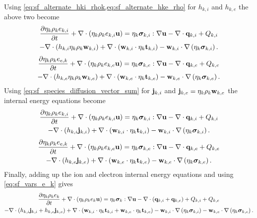 \documentclass[a4paper,11pt]{report}
\begin{document}
Using \cref{eq:sf_alternate_hki_rhok,eq:sf_alternate_hke_rho} for $h_{k,i}$ and $h_{k,e}$ the above two become
\begin{multline*}
    \frac{\partial \eta_k \rho_k e_{k,i}}{\partial t} + \nabla \cdot \left( \eta_k \rho_k e_{k,i} \mathbf{u} \right) = \eta_k \bm \sigma_{k,i} : \nabla \mathbf{u} - \nabla \cdot \mathbf{q}_{k,i} + Q_{k,i} \\
    - \nabla \cdot \left( h_{k,i} \eta_k \rho_k \mathbf{w}_{k,i} \right) + \nabla \cdot \left( \mathbf{w}_{k,i} \cdot \eta_k \mathbf{t}_{k,i} \right) - \mathbf{w}_{k,i} \cdot \nabla \left( \eta_k \bm \sigma_{k,i} \right).
\end{multline*}
\begin{multline*}
    \frac{\partial \eta_k \rho_k e_{e,k}}{\partial t} + \nabla \cdot \left( \eta_k \rho_k e_{k,e} \mathbf{u} \right) = \eta_k \bm \sigma_{k,e} : \nabla \mathbf{u} - \nabla \cdot \mathbf{q}_{k,e} + Q_{k,e} \\
    - \nabla \cdot \left( h_{k,e} \eta_k \rho_k \mathbf{w}_{k,e} \right) + \nabla \cdot \left( \mathbf{w}_{k,e} \cdot \eta_k \mathbf{t}_{k,e} \right) - \mathbf{w}_{k,e} \cdot \nabla \left( \eta_k \bm \sigma_{k,e} \right).
\end{multline*}
Using \cref{eq:sf_species_diffusion_vector_sum} for $\mathbf{j}_{k,i}$ and $\mathbf{j}_{k,e} = \eta_k \rho_k \mathbf{w}_{k,e}$ the internal energy equations become
\begin{multline*}
    \frac{\partial \eta_k \rho_k e_{k,i}}{\partial t} + \nabla \cdot \left( \eta_k \rho_k e_{k,i} \mathbf{u} \right) = \eta_k \bm \sigma_{k,i} : \nabla \mathbf{u} - \nabla \cdot \mathbf{q}_{k,i} + Q_{k,i} \\
    - \nabla \cdot \left( h_{k,i} \mathbf{j}_{k,i} \right) + \nabla \cdot \left( \mathbf{w}_{k,i} \cdot \eta_k \mathbf{t}_{k,i} \right) - \mathbf{w}_{k,i} \cdot \nabla \left( \eta_k \bm \sigma_{k,i} \right).
\end{multline*}
\begin{multline*}
    \frac{\partial \eta_k \rho_k e_{e,k}}{\partial t} + \nabla \cdot \left( \eta_k \rho_k e_{k,e} \mathbf{u} \right) = \eta_k \bm \sigma_{k,e} : \nabla \mathbf{u} - \nabla \cdot \mathbf{q}_{k,e} + Q_{k,e} \\
    - \nabla \cdot \left( h_{k,e} \mathbf{j}_{k,e} \right) + \nabla \cdot \left( \mathbf{w}_{k,e} \cdot \eta_k \mathbf{t}_{k,e} \right) - \mathbf{w}_{k,e} \cdot \nabla \left( \eta_k \bm \sigma_{k,e} \right).
\end{multline*}
Finally, adding up the ion and electron internal energy equations and using \cref{eq:sf_vars_e_k} gives
\begin{multline}
    \label{eq:sf_alternate_e_k}
    \frac{\partial \eta_k \rho_k e_k}{\partial t} + \nabla \cdot \left( \eta_k \rho_k e_k \mathbf{u} \right) = \eta_k \bm \sigma_k: \nabla \mathbf{u} - \nabla \cdot \left( \mathbf{q}_{k,i} + \mathbf{q}_{k,e} \right) + Q_{k,i} + Q_{k,e} \\
    - \nabla \cdot \left( h_{k,i} \mathbf{j}_{k,i} + h_{k,e} \mathbf{j}_{k,e} \right) + \nabla \cdot \left( \mathbf{w}_{k,i} \cdot \eta_k \mathbf{t}_{k,i} + \mathbf{w}_{k,e} \cdot \eta_k \mathbf{t}_{k,e} \right) - \mathbf{w}_{k,i} \cdot \nabla \left( \eta_k \bm \sigma_{k,i} \right) - \mathbf{w}_{k,e} \cdot \nabla \left( \eta_k \bm \sigma_{k,e} \right) .
\end{multline}
\end{document}
